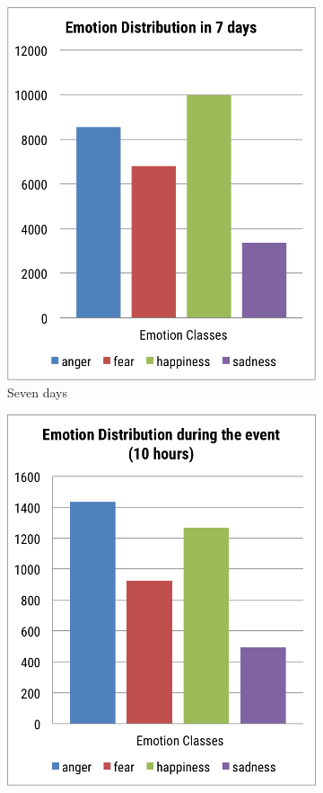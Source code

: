 \begin{figure}[htb!]
\begin{subfigure}{0.38\textwidth}
\centering
\includegraphics[width=0.95\linewidth]{EmotionDistributionWeek}
\caption{Seven days}
\label{fig:emotionDistributionWeek}
\end{subfigure}%
\begin{subfigure}{0.38\textwidth}
\centering
\includegraphics[width=0.95\linewidth]{EmotionDistributionEvent}

\end{subfigure}
\end{figure}
